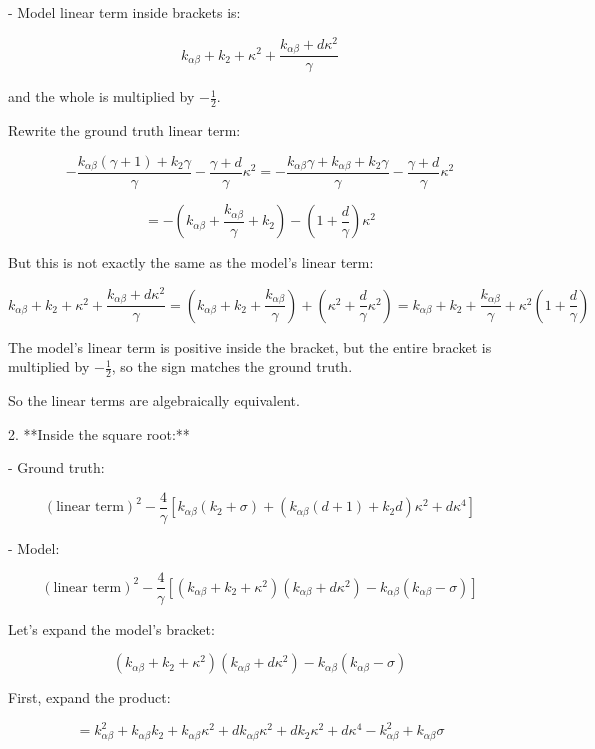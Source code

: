 \documentclass[10pt]{article}
\begin{document}
- Model linear term inside brackets is:

\[
k_{\alpha\beta} + k_2 + \kappa^2 + \frac{k_{\alpha\beta} + d \kappa^2}{\gamma}
\]

and the whole is multiplied by \(-\frac{1}{2}\).

Rewrite the ground truth linear term:

\[
-\frac{k_{\alpha\beta}(\gamma+1) + k_2 \gamma}{\gamma} - \frac{\gamma + d}{\gamma} \kappa^2 = -\frac{k_{\alpha\beta} \gamma + k_{\alpha\beta} + k_2 \gamma}{\gamma} - \frac{\gamma + d}{\gamma} \kappa^2
\]

\[
= -\left( k_{\alpha\beta} + \frac{k_{\alpha\beta}}{\gamma} + k_2 \right) - \left(1 + \frac{d}{\gamma}\right) \kappa^2
\]

But this is not exactly the same as the model's linear term:

\[
k_{\alpha\beta} + k_2 + \kappa^2 + \frac{k_{\alpha\beta} + d \kappa^2}{\gamma}
= \left(k_{\alpha\beta} + k_2 + \frac{k_{\alpha\beta}}{\gamma}\right) + \left(\kappa^2 + \frac{d}{\gamma} \kappa^2\right)
= k_{\alpha\beta} + k_2 + \frac{k_{\alpha\beta}}{\gamma} + \kappa^2 \left(1 + \frac{d}{\gamma}\right)
\]

The model's linear term is positive inside the bracket, but the entire bracket is multiplied by \(-\frac{1}{2}\), so the sign matches the ground truth.

So the linear terms are algebraically equivalent.

2. **Inside the square root:**

- Ground truth:

\[
\left( \text{linear term} \right)^2 - \frac{4}{\gamma} \left[ k_{\alpha\beta}(k_2 + \sigma) + (k_{\alpha\beta}(d+1) + k_2 d) \kappa^2 + d \kappa^4 \right]
\]

- Model:

\[
\left( \text{linear term} \right)^2 - \frac{4}{\gamma} \left[ (k_{\alpha\beta} + k_2 + \kappa^2)(k_{\alpha\beta} + d \kappa^2) - k_{\alpha\beta}(k_{\alpha\beta} - \sigma) \right]
\]

Let's expand the model's bracket:

\[
(k_{\alpha\beta} + k_2 + \kappa^2)(k_{\alpha\beta} + d \kappa^2) - k_{\alpha\beta}(k_{\alpha\beta} - \sigma)
\]

First, expand the product:

\[
= k_{\alpha\beta}^2 + k_{\alpha\beta} k_2 + k_{\alpha\beta} \kappa^2 + d k_{\alpha\beta} \kappa^2 + d k_2 \kappa^2 + d \kappa^4 - k_{\alpha\beta}^2 + k_{\alpha\beta} \sigma
\]
\end{document}
